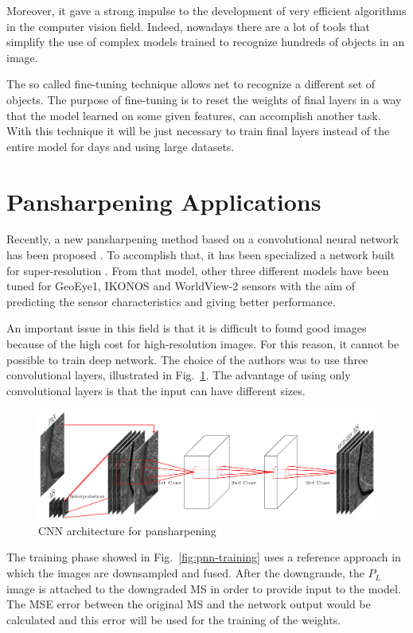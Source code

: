 \documentclass[12pt]{report}
\begin{document}
Moreover, it gave a strong impulse to the development of very efficient algorithms in the computer vision field. 
Indeed, nowadays there are a lot of tools that simplify the use of complex models trained to 
recognize hundreds of objects in an image. 

The so called fine-tuning technique allows net to recognize a different set of objects.
The purpose of fine-tuning is to reset the weights of final layers in a way that the model learned on some given features, can accomplish another task.
With this technique it will be just necessary to train final layers instead of the entire model for days and using large datasets.


\section{Pansharpening Applications}

Recently, a new pansharpening method based on a convolutional neural network has been proposed \cite{pnn}.
To accomplish that, it has been specialized a network built for super-resolution \cite{superesolution}.
From that model, other three different models have been tuned for GeoEye1, IKONOS and WorldView-2 sensors
with the aim of predicting the sensor characteristics and giving better performance. 

An important issue in this field is that it is difficult to found good images because of the high cost for high-resolution images.
For this reason, it cannot be possible to train deep network. The choice of the authors was to use three convolutional layers, illustrated in Fig.~\ref{fig:dl-pnn}.
The advantage of using only convolutional layers is that the input can have different sizes.

\begin{figure}[t]
    \centering
    \includegraphics[scale=.8]{dl-pnn.png}
    \caption{CNN architecture for pansharpening\cite{pnn}}
    \label{fig:dl-pnn}
\end{figure}

The training phase showed in Fig.~\ref{fig:pnn-training} uses a reference approach in which the images are downsampled and fused. 
After the downgrande, the $P_L$ image is attached to the downgraded MS in order to provide input to the model.
The MSE error between the original MS and the network output would be calculated and this error will be used for the training of the weights.
\end{document}
